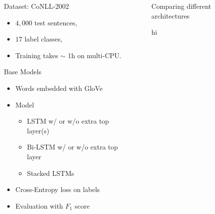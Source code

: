 \documentclass[final]{beamer}
\newlength{\sepwid}
\newlength{\onecolwid}
\newlength{\twocolwid}
\begin{document}
\begin{frame}[t]
\begin{columns}[t]
\begin{column}{\onecolwid}
\begin{block}{Dataset: CoNLL-2002}
\begin{itemize}
  \item $4,000$ test sentences,

  \item $17$ label classes,

  \item Training takes $\sim$ 1h on multi-CPU.
\end{itemize}
\end{block}

\begin{block}{Base Models}

\begin{itemize}
  \item Words embedded with GloVe

  \item Model
\begin{itemize}
\item LSTM w/ or w/o extra top layer(s)
\item Bi-LSTM w/ or w/o extra top layer
\item Stacked LSTMs
\end{itemize}

  \item Cross-Entropy loss on labels

  \item Evaluation with $F_1$ score
\end{itemize}

\end{block}

\end{column} %




\begin{column}{\sepwid}\end{column} %


\begin{column}{\twocolwid} %

  \begin{block}{Comparing different architectures}

  hi


  \end{block}




\end{column}
\end{columns}
\end{frame}
\end{document}
